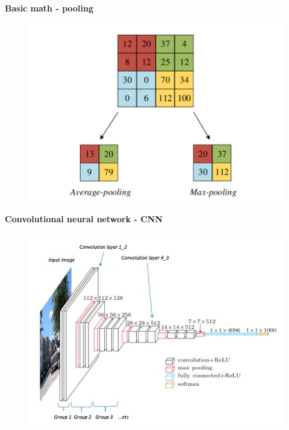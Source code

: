 \documentclass[xcolor=dvipsnames]{beamer}
\begin{document}
\begin{frame}{\bf Basic math - pooling}

\begin{figure}
  \includegraphics[scale=0.2]{../../diagrams/pooling.png}
\end{figure}

\end{frame}


\begin{frame}{\bf Convolutional neural network - CNN}

  \begin{figure}
    \includegraphics[scale=0.5]{../../diagrams/cnn.jpg}
  \end{figure}

\end{frame}
\end{document}
